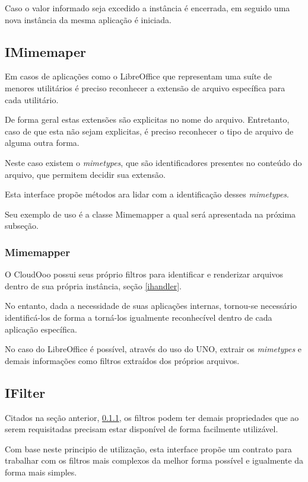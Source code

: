 Caso o valor informado seja excedido a instância é encerrada, em seguido uma nova instância da mesma aplicação é iniciada.


\subsection{IMimemaper}

Em casos de aplicações como o LibreOffice que representam uma suíte de menores utilitários é preciso reconhecer a extensão de arquivo específica para cada utilitário. 

De forma geral estas extensões são explicitas no nome do arquivo. Entretanto, caso de que esta não sejam explicitas, é preciso reconhecer o tipo de arquivo de alguma outra forma. 

Neste caso existem o \textit{mimetypes}, que são identificadores presentes no conteúdo do arquivo, que permitem decidir sua extensão. 

Esta interface propõe métodos ara lidar com a identificação desses \textit{mimetypes}.

Seu exemplo de uso é a classe Mimemapper a qual será apresentada na próxima subseção.


\subsubsection{Mimemapper}
\label{mimemapper}

O CloudOoo possui seus próprio filtros para identificar e renderizar arquivos dentro de sua própria instância, seção \ref{ihandler}.

No entanto, dada a necessidade de suas aplicações internas, tornou-se necessário identificá-los de forma a torná-los igualmente reconhecível dentro de cada aplicação específica.

No caso do LibreOffice é possível, através do uso do UNO, extrair os \textit{mimetypes} e demais informações como filtros extraídos dos próprios arquivos.


\subsection{IFilter}

Citados na seção anterior, \ref{mimemapper}, os filtros podem ter demais propriedades que ao serem requisitadas precisam estar disponível de forma facilmente utilizável.

Com base neste principio de utilização, esta interface propõe um contrato para trabalhar com os filtros mais complexos da melhor forma possível e igualmente da forma mais simples.


